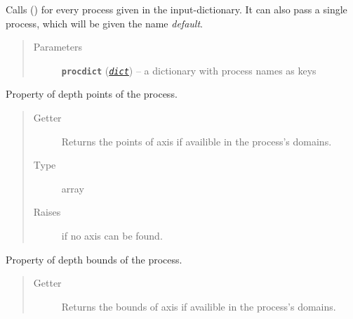 \documentclass[a4paper,10pt,english]{sphinxmanual}
\begin{document}
\begin{fulllineitems}
\begin{fulllineitems}
Calls {\hyperref[api/climlab.process:climlab.process.process.Process.add_subprocess]{\emph{}}} () for every process given in the 
input-dictionary. It can also pass a single process, which will 
be given the name \emph{default}.
\begin{quote}\begin{description}
\item[{Parameters}] \leavevmode
\textbf{\texttt{procdict}} (\href{http://docs.python.org/2.7/library/stdtypes.html\#dict}{\emph{\texttt{dict}}}) -- a dictionary with process names as keys

\end{description}\end{quote}

\end{fulllineitems}


\begin{fulllineitems}
\label{api/climlab.process:climlab.process.process.Process.depth}
Property of depth points of the process.
\begin{quote}\begin{description}
\item[{Getter}] \leavevmode
Returns the points of axis  if availible in the
process's domains.

\item[{Type}] \leavevmode
array

\item[{Raises}] \leavevmode
{}
if no  axis can be found.

\end{description}\end{quote}

\end{fulllineitems}


\begin{fulllineitems}
\label{api/climlab.process:climlab.process.process.Process.depth_bounds}
Property of depth bounds of the process.
\begin{quote}\begin{description}
\item[{Getter}] \leavevmode
Returns the bounds of axis  if availible in the
process's domains.


\end{description}
\end{quote}
\end{fulllineitems}
\end{fulllineitems}
\end{document}
